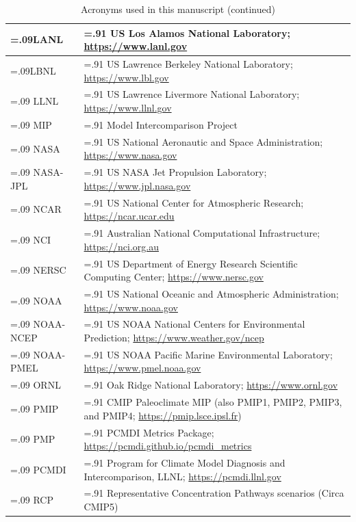 \documentclass[gmd, preprint]{copernicus}
\begin{document}
\addtocounter{table}{-1}
\begin{table}[htp]
\renewcommand{\arraystretch}{2}
\scriptsize
\centering
\caption{Acronyms used in this manuscript (continued)}
\resizebox{\textwidth}{!} {
	\begin{tabularx}{1\textwidth} { 
	  | >{\raggedright\arraybackslash\hsize=.09\hsize}X
	  | >{\centering\arraybackslash\hsize=.91\hsize}X | }
\hline
LANL & US Los Alamos National Laboratory; \url{https://www.lanl.gov} \\
\hline
LBNL & US Lawrence Berkeley National Laboratory; \url{https://www.lbl.gov} \\
\hline
LLNL & US Lawrence Livermore National Laboratory; \url{https://www.llnl.gov} \\
\hline
MIP & Model Intercomparison Project \\
\hline
NASA & US National Aeronautic and Space Administration; \url{https://www.nasa.gov} \\
\hline
NASA-JPL & US NASA Jet Propulsion Laboratory; \url{https://www.jpl.nasa.gov} \\
\hline
NCAR & US National Center for Atmospheric Research; \url{https://ncar.ucar.edu} \\
\hline
NCI & Australian National Computational Infrastructure; \url{https://nci.org.au} \\
\hline
NERSC & US Department of Energy Research Scientific Computing Center; \url{https://www.nersc.gov} \\
\hline
NOAA & US National Oceanic and Atmospheric Administration; \url{https://www.noaa.gov} \\
\hline
NOAA-NCEP & US NOAA National Centers for Environmental Prediction; \url{https://www.weather.gov/ncep} \\
\hline
NOAA-PMEL & US NOAA Pacific Marine Environmental Laboratory; \url{https://www.pmel.noaa.gov} \\
\hline
ORNL & Oak Ridge National Laboratory; \url{https://www.ornl.gov} \\
\hline
PMIP & CMIP Paleoclimate MIP (also PMIP1, PMIP2, PMIP3, and PMIP4; \url{https://pmip.lsce.ipsl.fr}) \\
\hline
PMP & PCMDI Metrics Package; \url{https://pcmdi.github.io/pcmdi_metrics} \\
\hline
PCMDI & Program for Climate Model Diagnosis and Intercomparison, LLNL; \url{https://pcmdi.llnl.gov} \\
\hline
RCP & Representative Concentration Pathways scenarios (Circa CMIP5) \\

\end{tabularx}}
\end{table}
\end{document}

